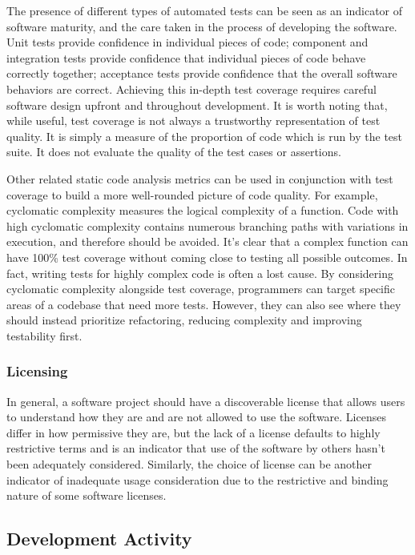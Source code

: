 \documentclass{article}
\begin{document}
The presence of different types of automated tests can be seen as an indicator of software maturity, and the care taken in the process of developing the software. Unit tests provide confidence in individual pieces of code; component and integration tests provide confidence that individual pieces of code behave correctly together; acceptance tests provide confidence that the overall software behaviors are correct. Achieving this in-depth test coverage requires careful software design upfront and throughout development. It is worth noting that, while useful, test coverage is not always a trustworthy representation of test quality. It is simply a measure of the proportion of code which is run by the test suite. It does not evaluate the quality of the test cases or assertions.

Other related static code analysis metrics can be used in conjunction with test coverage to build a more well-rounded picture of code quality. For example, cyclomatic complexity measures the logical complexity of a function. Code with high cyclomatic complexity contains numerous branching paths with variations in execution, and therefore should be avoided. It’s clear that a complex function can have 100\% test coverage without coming close to testing all possible outcomes. In fact, writing tests for highly complex code is often a lost cause. By considering cyclomatic complexity alongside test coverage, programmers can target specific areas of a codebase that need more tests. However, they can also see where they should instead prioritize refactoring, reducing complexity and improving testability first.

\subsubsection{Licensing}
In general, a software project should have a discoverable license that allows users to understand how they are and are not allowed to use the software. Licenses differ in how permissive they are, but the lack of a license defaults to highly restrictive terms and is an indicator that use of the software by others hasn’t been adequately considered. Similarly, the choice of license can be another indicator of inadequate usage consideration due to the restrictive and binding nature of some software licenses. 


\subsection{Development Activity}
\end{document}
